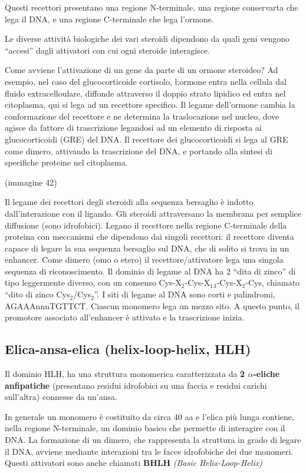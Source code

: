 \documentclass[11pt]{book}
\begin{document}
Questi recettori presentano una regione N-terminale, una regione
conservarta che lega il DNA, e una regione C-terminale che lega
l'ormone.

Le diverse attività biologiche dei vari steroidi dipendono da quali geni
vengono ``accesi'' dagli attivatori con cui ogni steroide interagisce.

Come avviene l'attivazione di un gene da parte di un ormone steroideo?
Ad esempio, nel caso del glucocorticoide cortisolo, l;ormone entra nella
cellula dal fluido extracelloulare, diffonde attraverso il doppio strato
lipidico ed entra nel citoplasma, qui si lega ad un recettore specifico.
Il legame dell'ormone cambia la conformazione del recettore e ne
determina la traslocazione nel nucleo, dove agisce da fattore di
trascrizione legandosi ad un elemento di risposta ai glucocorticoidi
(GRE) del DNA. Il recettore dei glucocorticoidi si lega al GRE come
dimero, attivando la trascrizione del DNA, e portando alla sintesi di
specifiche proteine nel citoplasma.

(immagine 42)

Il legame dei recettori degli steroidi alla sequenza bersaglio è indotto
dall'interazione con il ligando. Gli steroidi attraversano la membrana
per semplice diffusione (sono idrofobici). Legano il recettore nella
regione C-terminale della proteina con meccanismi che dipendono dai
singoli recettori: il recettore diventa capace di legare la sua sequenza
bersaglio sul DNA, che di solito si trova in un enhancer. Come dimero
(omo o etero) il recettore/attivatore lega una singola sequenza di
riconoscimento. Il dominio di legame al DNA ha 2 ``dita di zinco'' di
tipo leggermente diverso, con un consenso
Cys-X\(_2\)-Cys-X\(_1\)\(_3\)-Cys-X\(_2\)-Cys, chiamato ``dito di zinco
Cys\(_2\)/Cys\(_2\)''. I siti di legame al DNA sono corti e palindromi,
AGAAAnnnTGTTCT. Ciascun monomero lega un mezzo sito. A questo punto, il
promotore associato all'enhancer è attivato e la trascrizione inizia.

\subsection{Elica-ansa-elica (helix-loop-helix,
HLH)}\label{elica-ansa-elica-helix-loop-helix-hlh}

Il dominio HLH, ha una struttura monomerica caratterizzata da \textbf{2
\(\alpha\)-eliche anfipatiche} (presentano residui idrofobici su una
faccia e residui carichi sull'altra) connesse da un'ansa.

In generale un monomero è costituito da circa 40 aa e l'elica più lunga
contiene, nella regione N-terminale, un dominio basico che permette di
interagire con il DNA. La formazione di un dimero, che rappresenta la
struttura in grado di legare il DNA, avviene mediante interazioni tra le
facce idrofobiche dei due monomeri. Questi attivatori sono anche
chiamati \textbf{BHLH} \emph{(Basic Helix-Loop-Helix)}
\end{document}
